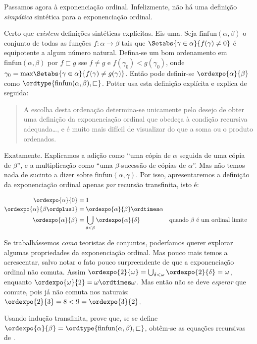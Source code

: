 \documentclass[../../../include/open-logic-section]{subfiles}
\begin{document}

Passamos agora à exponenciação ordinal. Infelizmente, não há uma definição
\emph{simpática} sintética para a exponenciação ordinal.

Certo que \emph{existem} definições sintéticas explícitas. Eis uma.
Seja $\text{finfun}(\alpha,\beta)$ o conjunto de todas as funções $f
\colon \alpha \to \beta$ tais que $\Setabs{\gamma \in
\alpha}{f(\gamma) \neq 0}$ é equipotente a algum número natural.
Defina-se um bom ordenamento em $\text{finfun}(\alpha,\beta)$ por $f
\sqsubset g$ sse $f \neq g$ e $f(\gamma_0) < g(\gamma_0)$, onde
$\gamma_0 = \text{max}\Setabs{\gamma \in \alpha}{f(\gamma) \neq
g(\gamma)}$. Então pode definir-se $\ordexpo{\alpha}{\beta}$ como
$\ordtype{\text{finfun}(\alpha, \beta), \sqsubset}$. Potter usa
esta definição explícita e explica de seguida:
\begin{quote}
	A escolha desta ordenação determina-se unicamente pelo desejo de
	obter uma definição da exponenciação ordinal que obedeça à
	condição recursiva adequada\ldots, e é muito mais difícil de
	visualizar do que a soma ou o produto ordenados.
	\citep[p.~199]{Potter2004}
\end{quote}
Exatamente. Explicamos a adição como ``uma cópia de $\alpha$ seguida de uma
cópia de $\beta$'', e a multiplicação como ``uma $\beta$-sucessão de
cópias de $\alpha$''. Mas não temos nada de sucinto a dizer sobre
$\text{finfun}(\alpha, \gamma)$. Por isso, apresentaremos a
definição da exponenciação ordinal apenas \emph{por} recursão transfinita, isto é:

\begin{defn}
\begin{align*}
	\ordexpo{\alpha}{0} &= 1\\
	\ordexpo{\alpha}{\beta\ordplus 1} &=\ordexpo{\alpha}{\beta} \ordtimes \alpha\\
	\ordexpo{\alpha}{\beta} &= \bigcup_{\delta < \beta}\ordexpo{\alpha}{\delta}& & \text{quando $\beta$ é um ordinal limite}
\end{align*}
\end{defn}

Se trabalhássemos \emph{como} teoristas de conjuntos, poderíamos querer explorar
algumas propriedades da exponenciação ordinal. Mas pouco mais temos a acrescentar,
salvo notar o fato pouco surpreendente de que a exponenciação ordinal não comuta.
Assim $\ordexpo{2}{\omega} =
\bigcup_{\delta < \omega}\ordexpo{2}{\delta} = \omega$, enquanto
$\ordexpo{\omega}{2} = \omega \ordtimes \omega$. Mas então não se deve
\emph{esperar} que comute, pois já não comuta nos naturais: $\ordexpo{2}{3} = 8 < 9 = \ordexpo{3}{2}$.

\begin{prob}
Usando indução transfinita, prove que, se se define
$\ordexpo{\alpha}{\beta} = \ordtype{\text{finfun}(\alpha, \beta),
\sqsubset}$, obtêm-se as equações recursivas de
.
\end{prob}
\end{document}
